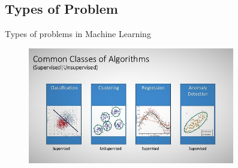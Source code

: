 \documentclass[10pt]{beamer}
\begin{document}
	\subsection{Types of Problem}
	\begin{frame}[c]{Types of problems in Machine Learning}
	\begin{figure}
		\includegraphics[width=\linewidth,height=2in]{images/typesofproblem}
	\end{figure}
	\end{frame}
\end{document}
